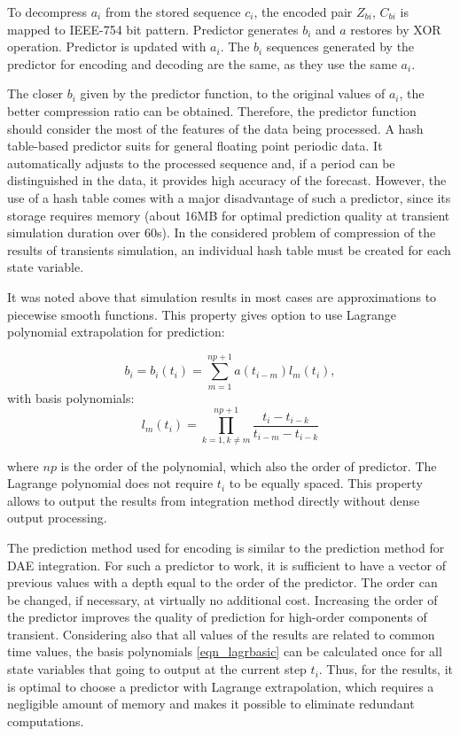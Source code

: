 \documentclass[lettersize,journal]{IEEEtran}
\begin{document}
To decompress \(a_i\) from the stored sequence \(c_i\), the encoded pair \(Z_{bi}\), \(C_{bi}\) 
is mapped to IEEE-754 bit pattern. Predictor generates \(b_i\) and \(a\) restores by XOR operation.
Predictor is updated with \(a_i\). The \(b_i\) sequences generated by the predictor for encoding and decoding are the same, as they use the same \(a_i\).

The closer \(b_i\) given by the predictor function, to the original values of \(a_i\), the better compression ratio can be obtained. 
Therefore, the predictor function should consider the most of the features of the data being processed. 
A hash table-based predictor suits for general floating point periodic data. It automatically adjusts to the processed sequence and, if a period can be distinguished in the data, it provides high accuracy of the forecast. 
However, the use of a hash table comes with a major disadvantage of such a predictor, since 
its storage requires memory (about 16MB for optimal prediction quality at transient simulation duration over 60s). 
In the considered problem of compression of the results of transients simulation, an individual hash table must be created for each state variable.

It was noted above that simulation results  in most cases are approximations to piecewise smooth functions.
This property gives option to use Lagrange polynomial extrapolation for prediction:

\begin{equation}
	\label{eqn_lagrb}
	b_i=b_i(t_i)=\sum_{m=1}^{np+1} a(t_{i-m})l_m(t_i),
\end{equation}
\noindent with basis polynomials:
\begin{equation}
	\label{eqn_lagrbasic}
	l_m(t_i)=\prod_{k=1, k \neq m}^{np+1} \frac{t_i-t_{i-k}}{t_{i-m}-t_{i-k}}
\end{equation}

\noindent where \(np\) is the order of the polynomial, which also the order of predictor. 
The Lagrange polynomial does not require \(t_i\) to be equally spaced. This property allows to output
the results from integration method directly without dense output processing.

The prediction method used for encoding is similar to the prediction method for DAE integration. 
For such a predictor to work, it is sufficient to have a vector of previous values with a depth equal to the order of the predictor. 
The order can be changed, if necessary, at virtually no additional cost. 
Increasing the order of the predictor improves the quality of prediction for high-order components of transient. 
Considering also that all values of the results are related to common time values, the basis polynomials \ref{eqn_lagrbasic} can be calculated once 
for all state variables that going to output at the current step \(t_i\). Thus, for the results, it is optimal 
to choose a predictor with Lagrange extrapolation, which requires a negligible amount of memory and makes it possible to eliminate redundant computations.
\end{document}
